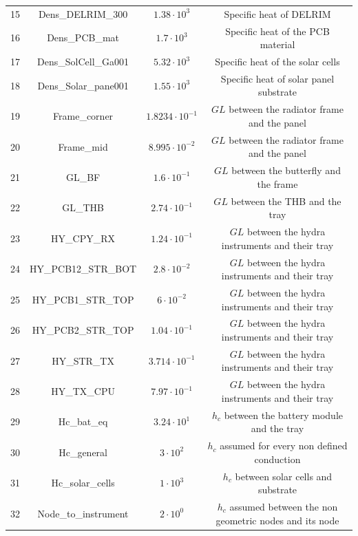 \begin{table}[H]
{\begin{tabular}{cccc}
        15 & Dens\_DELRIM\_300 & $1.38 \cdot 10^{3}$ & Specific heat of DELRIM \\
        16 & Dens\_PCB\_mat & $1.7 \cdot 10^{3}$ & Specific heat of the PCB material \\
        17 & Dens\_SolCell\_Ga001 & $5.32 \cdot 10^{3}$ & Specific heat of the solar cells \\
        18 & Dens\_Solar\_pane001 & $1.55 \cdot 10^{3}$ & Specific heat of solar panel substrate \\
        19 & Frame\_corner & $1.8234 \cdot 10^{-1}$ & $GL$ between the radiator frame and the panel\\
        20 & Frame\_mid & $8.995 \cdot 10^{-2}$ & $GL$ between the radiator frame and the panel \\
        21 & GL\_BF & $1.6 \cdot 10^{-1}$ & $GL$ between the butterfly and the frame \\
        22 & GL\_THB & $2.74 \cdot 10^{-1}$ & $GL$ between the THB and the tray \\
        23 & HY\_CPY\_RX & $1.24 \cdot 10^{-1}$ & $GL$ between the hydra instruments and their tray \\
        24 & HY\_PCB12\_STR\_BOT & $2.8 \cdot 10^{-2}$ & $GL$ between the hydra instruments and their tray \\
        25 & HY\_PCB1\_STR\_TOP & $6 \cdot 10^{-2}$ & $GL$ between the hydra instruments and their tray \\
        26 & HY\_PCB2\_STR\_TOP & $1.04 \cdot 10^{-1}$ & $GL$ between the hydra instruments and their tray \\
        27 & HY\_STR\_TX & $3.714 \cdot 10^{-1}$ & $GL$ between the hydra instruments and their tray \\
        28 & HY\_TX\_CPU & $7.97 \cdot 10^{-1}$ & $GL$ between the hydra instruments and their tray \\
        29 & Hc\_bat\_eq & $3.24 \cdot 10^{1}$ & $h_c$ between the battery module and the tray \\
        30 & Hc\_general & $3 \cdot 10^{2}$ & $h_c$ assumed for every non defined conduction \\
        31 & Hc\_solar\_cells & $1 \cdot 10^{3}$ & $h_c$ between solar cells and substrate \\
        32 & Node\_to\_instrument & $2 \cdot 10^{0}$ & $h_c$ assumed between the non geometric nodes and its node \\

        \hline
        \end{tabular}%
        }
    \end{table}


